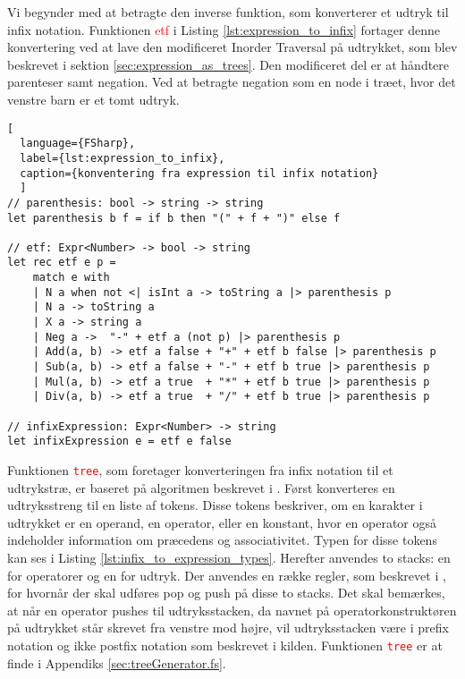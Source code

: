 Vi begynder med at betragte den inverse funktion, som konverterer et udtryk til infix notation. Funktionen \textcolor{red}{etf} i Listing \ref{lst:expression_to_infix} fortager denne konvertering ved at lave den modificeret Inorder Traversal på udtrykket, som blev beskrevet i sektion \ref{sec:expression_as_trees}. Den modificeret del er at håndtere parenteser samt negation. Ved at betragte negation som en node i træet, hvor det venstre barn er et tomt udtryk.

\begin{lstlisting}[
  language={FSharp}, 
  label={lst:expression_to_infix}, 
  caption={konventering fra expression til infix notation}
  ]
// parenthesis: bool -> string -> string
let parenthesis b f = if b then "(" + f + ")" else f

// etf: Expr<Number> -> bool -> string
let rec etf e p =
    match e with
    | N a when not <| isInt a -> toString a |> parenthesis p
    | N a -> toString a
    | X a -> string a
    | Neg a ->  "-" + etf a (not p) |> parenthesis p
    | Add(a, b) -> etf a false + "+" + etf b false |> parenthesis p
    | Sub(a, b) -> etf a false + "-" + etf b true |> parenthesis p
    | Mul(a, b) -> etf a true  + "*" + etf b true |> parenthesis p
    | Div(a, b) -> etf a true  + "/" + etf b true |> parenthesis p

// infixExpression: Expr<Number> -> string
let infixExpression e = etf e false
\end{lstlisting}

Funktionen \textcolor{red}{\texttt{tree}}, som foretager konverteringen fra infix notation til et udtrykstræ, er baseret på algoritmen beskrevet i \cite{convert_expression}. Først konverteres en udtryksstreng til en liste af tokens. Disse tokens beskriver, om en karakter i udtrykket er en operand, en operator, eller en konstant, hvor en operator også indeholder information om præcedens og associativitet. Typen for disse tokens kan ses i Listing \ref{lst:infix_to_expression_types}. Herefter anvendes to stacks: en for operatorer og en for udtryk. Der anvendes en række regler, som beskrevet i \cite{convert_expression}, for hvornår der skal udføres pop og push på disse to stacks. Det skal bemærkes, at når en operator pushes til udtryksstacken, da navnet på operatorkonstruktøren på udtrykket står skrevet fra venstre mod højre, vil udtryksstacken være i prefix notation og ikke postfix notation som beskrevet i kilden. Funktionen \textcolor{red}{\texttt{tree}} er at finde i Appendiks \ref{sec:treeGenerator.fs}.

